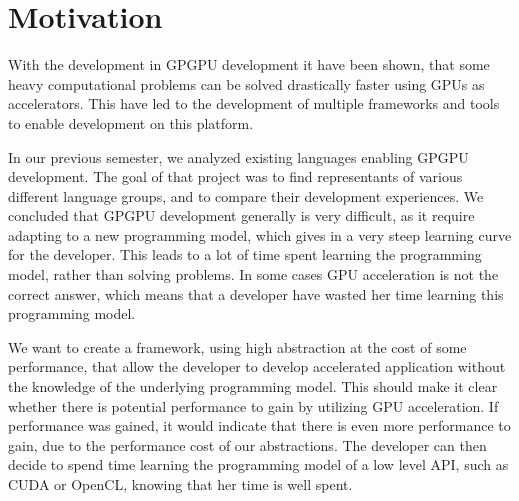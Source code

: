 \section{Motivation}\label{cha:motivation}
With the development in GPGPU development it have been shown, that some heavy computational problems can be solved drastically faster using GPUs as accelerators. This have led to the development of multiple frameworks and tools to enable development on this platform.

In our previous semester\cite{sw9Report}, we analyzed existing languages enabling GPGPU development. The goal of that project was to find representants of various different language groups, and to compare their development experiences. We concluded that GPGPU development generally is very difficult, as it require adapting to a new programming model, which gives in a very steep learning curve for the developer. This leads to a lot of time spent learning the programming model, rather than solving problems. In some cases GPU acceleration is not the correct answer, which means that a developer have wasted her time learning this programming model.



We want to create a framework, using high abstraction at the cost of some performance, that allow the developer to develop accelerated application without the knowledge of the underlying programming model. This should make it clear whether there is potential performance to gain by utilizing GPU acceleration. If performance was gained, it would indicate that there is even more performance to gain, due to the performance cost of our abstractions. The developer can then decide to spend time learning the programming model of a low level API, such as CUDA or OpenCL, knowing that her time is well spent.


